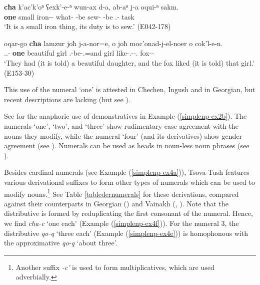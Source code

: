 \begin{exe}
	\ex\label{simplenp-ex2}
	\begin{xlist}
		
		\ex\label{simplenp-ex2a}
		\gll \textbf{cħa} k'ac'k'oⁿ ʕexk'-e-ⁿ wun-ax d-a, ab-aⁿ j-a oqui-ⁿ sakm. \\
		\textbf{one} small iron-{\Obl}-{\Gen} what-{\Indf} {\D}-be sew-{\Inf} {\J}-be {\Dist}.{\Obl}-{\Gen} task \\
		\trans `It is a small iron thing, its duty is to sew.'
		\hfill (E042-178)
		
		
		\ex\label{simplenp-ex2b}
		\gll oqar-go \textbf{cħa} lamzur joħ j-a-nor=e, o joħ moc'onad-j-el-noer o cok'l-e-n. \\
		{\Dist}.{\Pl}.{\Obl}-{\Adess} \textbf{one} beautiful girl {\F}.{\Sg}-be-{\Nw}.{\Rem}=and {\Dist} girl like-{\F}.{\Sg}-{\Intr}-{\Nw}.{\Rem} {\Dist} fox-{\Obl}-{\Dat} \\
		\trans `They had (it is told) a beautiful daughter, and the fox liked (it is told) that girl.' 
		\hfill (E153-30)
		
	\end{xlist}
\end{exe}

This use of the numeral `one' is attested in Chechen, Ingush and in Georgian, but recent descriptions are lacking (but see \citealt{lomtatidze1962one}).

See  for the anaphoric use of demonstratives in Example (\ref{simplenp-ex2b}). The numerals `one', `two', and `three' show rudimentary case agreement with the nouns they modify, while the numeral `four' (and its derivatives) show gender agreement (see ). Numerals can be used as heads in noun-less noun phrases (see ).

Besides cardinal numerals (see Example (\ref{simplenp-ex4a})), Tsova-Tush features various derivational suffixes to form other types of numerals which can be used to modify nouns.\footnote{Another suffix \textit{-c'} is used to form multiplicatives, which are used adverbially.
}
See Table \ref{tabledernumerals} for these derivations, compared against their counterparts in Georgian (\cite[265]{aronson91}) and Vainakh (\cite[197]{nichols11}, \cite[53]{nichols94Che}). Note that the distributive is formed by reduplicating the first consonant of the numeral. Hence, we find \textit{cħa-c} `one each' (Example (\ref{simplenp-ex4f})). For the numeral 3, the distributive \textit{qo-q} `three each' (Example (\ref{simplenp-ex4e})) is homophonous with the approximative \textit{qo-q} `about three'.


